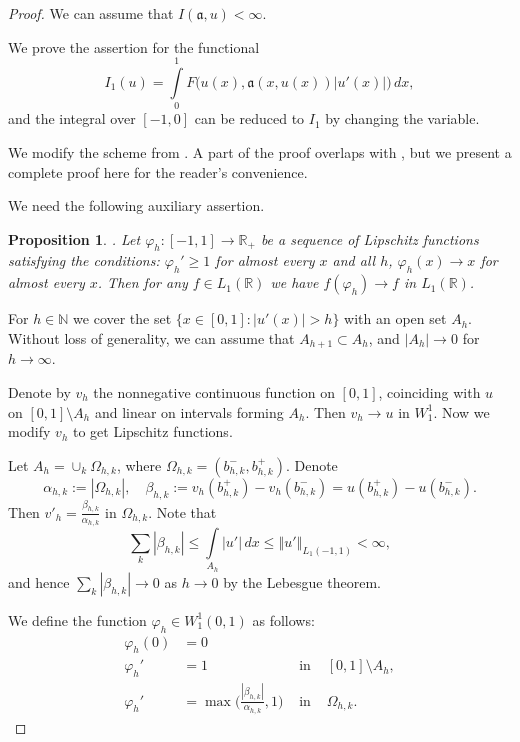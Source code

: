 \documentclass[12pt]{article}
\newcommand{\Real}{\mathbb R}
\newcommand{\Nat}{\mathbb N}
\newcommand{\norm}[1]{\left\Vert#1\right\Vert}
\newcommand{\abs}[1]{\left\vert#1\right\vert}
\renewcommand{\phi}{\varphi}
\renewcommand{\ge}{\geqslant}
\renewcommand{\le}{\leqslant}
\newtheorem{prop}{Proposition}
\newcommand{\W}{W_1^1}
\begin{document}
\begin{proof}
We can assume that $I( \mathfrak a, u ) < \infty$.

We prove the assertion for the functional
$$I_1( u ) = \int\limits_0^1 F\big( u(x), \mathfrak a(x, u(x)) |u'(x)| \big) \, dx,$$
and the integral over $[-1, 0]$ can be reduced to $I_1$ by changing the variable.

We modify the scheme from \cite[Theorem 2.4]{ASC}.
A part of the proof overlaps with \cite{ASC}, but we present a complete proof here for the reader's convenience.

We need the following auxiliary assertion.

\begin{prop}
\label{convToOne}
{\rm \cite[Lemma 2.7]{ASC}.}
Let $\phi_h: [-1, 1] \to \Real_+$ be a sequence of Lipschitz functions satisfying the conditions:
$\phi_h' \ge 1$ for almost every $x$ and all $h$, $\phi_h( x ) \to x$ for almost every $x$.
Then for any $f \in L_1(\Real)$ we have $f(\phi_h) \to f$ in $L_1(\Real)$.
\end{prop}

For $h \in \Nat$ we cover the set $\{ x \in [0, 1]: |u'(x)| > h \}$ with an open set $A_h$.
Without loss of generality, we can assume that
$A_{h + 1} \subset A_{h}$, and $\abs{A_h} \to 0$ for $h \to \infty$.

Denote by $v_h$ the nonnegative continuous function on $[0, 1]$,
coinciding with $u$ on $[0, 1] \setminus A_h$ and
linear on intervals forming $A_h$.
Then $v_h \to u$ in $\W$.
Now we modify $v_h$ to get Lipschitz functions.

Let $A_h = \cup_k \Omega_{h,k}$, where $\Omega_{h,k} = ( b_{h,k}^-, b_{h,k}^+ )$.
Denote
$$\alpha_{h,k} := \abs{\Omega_{h,k}}, \quad
\beta_{h,k} := v_h(b_{h,k}^+) - v_h(b_{h,k}^-) = u(b_{h,k}^+) - u(b_{h,k}^-).$$
Then $v'_h = \frac{\beta_{h,k}}{\alpha_{h,k}}$ in $\Omega_{h,k}$.
Note that
$$\sum_k \abs{\beta_{h,k}} \le \int\limits_{A_h} \abs{u'} \, dx \le \norm{u'}_{L_1(-1, 1)}< \infty,$$
and hence
$\sum_k \abs{\beta_{h,k}} \to 0$ as $h \to 0$ by the Lebesgue theorem.

We define the function $\phi_h \in \W(0, 1)$ as follows:
$$
\begin{aligned}
\phi_h( 0 ) &= 0 & & \\
\phi_h' &=  1 & \text{ in } & [0, 1] \setminus A_h,\\
\phi_h' &=  \max \Big( \frac{ \abs{\beta_{h,k}} }{ \alpha_{h,k} }, 1 \Big) & \text{ in } & \Omega_{h,k}.
\end{aligned}
$$	


\end{proof}
\end{document}
